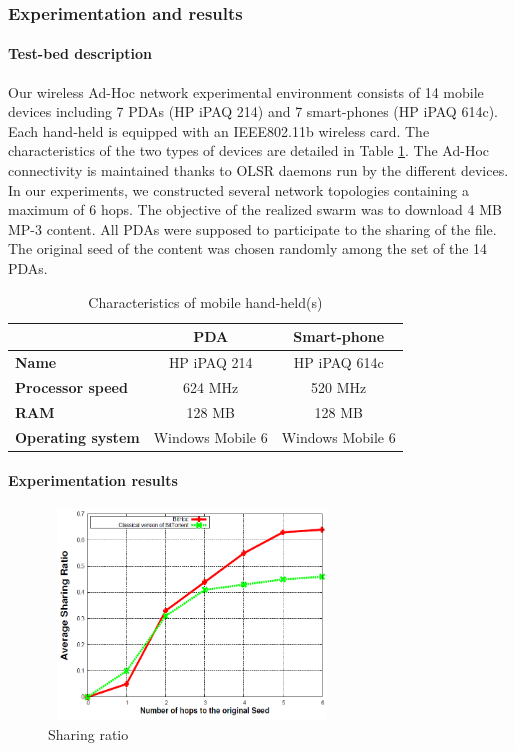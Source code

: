 \subsubsection{Experimentation and results}
\label{sectest}

\paragraph{Test-bed description}

Our wireless Ad-Hoc network experimental environment consists of 14 mobile devices including 7 PDAs (HP iPAQ 214) and 7 smart-phones (HP iPAQ 614c). Each hand-held is equipped with an IEEE802.11b wireless card. The characteristics of the two types of devices are detailed in Table \ref{tabcarac}. The Ad-Hoc connectivity is maintained thanks to OLSR daemons run by the different devices. In our experiments, we constructed several network topologies containing a maximum of 6 hops. The objective of the realized swarm was to download 4 MB MP-3 content. All PDAs were supposed to participate to the sharing of the file. The original seed of the content was chosen randomly among the set of the 14 PDAs.

\begin{table}[!h]
\center
\label{tabcarac}
\caption{Characteristics of mobile hand-held(s)}
\begin{tabular}{|l|c|c|}
  \hline
   & \textbf{PDA} & \textbf{Smart-phone} \\
  \hline
  \textbf{Name} & HP iPAQ 214 & HP iPAQ 614c\\
\hline
  \textbf{Processor speed} & 624 MHz & 520 MHz \\
  \hline
\textbf{RAM} & 128 MB & 128 MB \\
  \hline
\textbf{Operating system} & Windows Mobile 6 & Windows Mobile 6 \\
  \hline
\end{tabular}
\end{table}

\paragraph{Experimentation results}

\begin{figure}[!h]
  \begin{center}
    \includegraphics[width=3in,height=2.2in]{Chapitre2/sharingratio.png}
  \end{center}
  \caption{Sharing ratio}
  \label{figsharing}
\end{figure}

